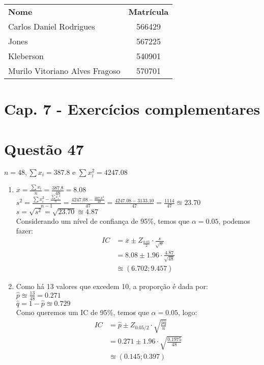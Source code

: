 \documentclass[12pt]{article}
\newcommand{\quest}[1]{\section*{Questão #1}} %
\begin{document}
\begin{table}[]
\centering
\begin{tabular}{lc}
\hline
\textbf{Nome}                  & \textbf{Matrícula}\\
Carlos Daniel Rodrigues        &  566429           \\
Jones                          &  567225           \\
Kleberson                      &  540901           \\
Murilo Vitoriano Alves Fragoso & 570701            \\ \hline
\end{tabular}
\end{table}

\section{Cap. 7 - Exercícios complementares}
\quest{47}
$n = 48, \sum{x_i}= 387.8 \text{ e } \sum{x_i^2=4247.08}$ 
\begin{enumerate}
    \item $\overline{x} = \frac{\sum{x_i}}{n} = \frac{387.8}{48} = 8.08$\\
          $s^2 = \frac{\sum{x_i^2} - \frac{\sum{x_i}^2}{n}}{n-1} = \frac{4247.08 - \frac{387.8^2}{48}}{47} = \frac{4247.08-3133.10}{47} = \frac{1114}{47} \approxeq 23.70$\\
          $s = \sqrt{s^2} = \sqrt{23.70} \approxeq 4.87$\\
          Considerando um nível de confiança de 95\%, temos que $\alpha = 0.05$, podemos fazer:
          \begin{align*}
              IC &= \overline{x} \pm Z_{\frac{0.05}{2}} \cdot \frac{s}{\sqrt{n}}\\
                 &= 8.08 \pm 1.96 \cdot \frac{4.87}{\sqrt{48}}\\
                 &\approxeq \left (6.702; 9.457 \right)
          \end{align*}
    \item Como há 13 valores que excedem 10, a proporção é dada por:\\
    $\hat{p} \approxeq \frac{13}{48} = 0.271$\\
    $\hat{q} = 1 - \hat{p} \approxeq 0.729$\\
    Como queremos um IC de 95\%, temos que $\alpha = 0.05$, logo:
    \begin{align*}
        IC &= \hat{p} \pm Z_{0.05/2} \cdot \sqrt{\frac{\hat{p}\hat{q}}{n}}\\
            &= 0.271 \pm 1.96 \cdot \sqrt{\frac{0.1975}{48}}\\
            &\approxeq (0.145;0.397)
    \end{align*}
\end{enumerate}
\end{document}
